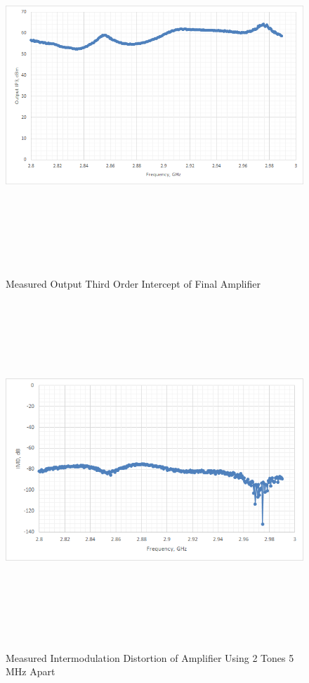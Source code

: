  \begin{figure}
  \centering
  \includegraphics[width=5in,height=5in,keepaspectratio]{figures/test/output_ip3}\\
  \caption{Measured Output Third Order Intercept of Final Amplifier}
  \label{fig:output_ip3}
\end{figure}

\begin{figure}

  \centering
  \includegraphics[width=5in,height=5in,keepaspectratio]{figures/test/meas_imd}\\
  \caption{Measured Intermodulation Distortion of Amplifier Using 2 Tones 5 MHz Apart}
  \label{fig:meas_imd}
\end{figure}

